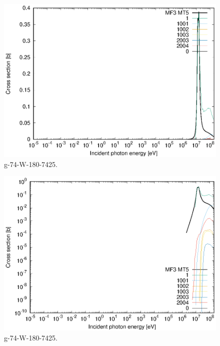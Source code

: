 \begin{figure}
 \includegraphics[width=\linewidth]{eps/g_74-W-180_7425.eps}
  \caption{g-74-W-180-7425.}
\end{figure}
\begin{figure}
 \includegraphics[width=\linewidth]{eps-log/g_74-W-180_7425.eps}
 \caption{g-74-W-180-7425.}
\end{figure}
\newpage \clearpage

